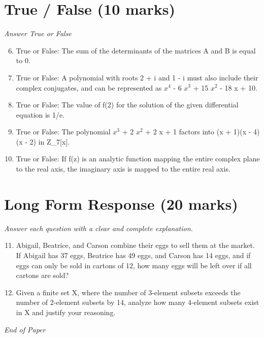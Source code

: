 \documentclass[12pt]{article}
\begin{document}
\section*{True / False (10 marks)}
\textit{Answer True or False}
\begin{enumerate}[label=\arabic*.]
\setcounter{enumi}{5}
\item True or False: The sum of the determinants of the matrices A and B is equal to 0.
\item True or False: A polynomial with roots 2 + i and 1 - i must also include their complex conjugates, and can be represented as $x^4$ - 6 $x^3$ + 15 $x^2$ - 18 x + 10.
\item True or False: The value of f(2) for the solution of the given differential equation is 1/e.
\item True or False: The polynomial $x^3$ + 2 $x^2$ + 2 x + 1 factors into (x + 1)(x - 4)(x - 2) in Z\_7[x].
\item True or False: If f(z) is an analytic function mapping the entire complex plane to the real axis, the imaginary axis is mapped to the entire real axis.
\end{enumerate}

\section*{Long Form Response (20 marks)}
\textit{Answer each question with a clear and complete explanation.}
\begin{enumerate}[label=\arabic*.]
\setcounter{enumi}{10}
\item Abigail, Beatrice, and Carson combine their eggs to sell them at the market. If Abigail has 37 eggs, Beatrice has 49 eggs, and Carson has 14 eggs, and if eggs can only be sold in cartons of 12, how many eggs will be left over if all cartons are sold?
\item Given a finite set X, where the number of 3-element subsets exceeds the number of 2-element subsets by 14, analyze how many 4-element subsets exist in X and justify your reasoning.
\end{enumerate}

\vfill
\noindent\textit{End of Paper}
\end{document}
